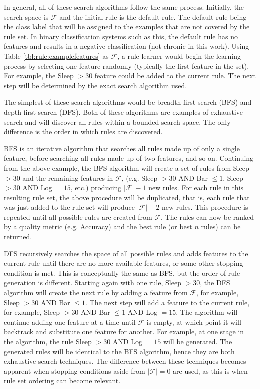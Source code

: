 In general, all of these search algorithms follow the same process. Initially, the search space is $\mathcal{F}$ and the initial rule is the default rule. The default rule being the class label that will be assigned to the examples that are not covered by the rule set. In binary classification systems such as this, the default rule has no features and results in a negative classification (not chronic in this work). Using Table \ref{tbl:rule:examplefeatures} as $\mathcal{F}$, a rule learner would begin the learning process by selecting one feature randomly (typically the first feature in the set). For example, the Sleep $> 30$ feature could be added to the current rule. The next step will be determined by the exact search algorithm used.

The simplest of these search algorithms would be breadth-first search (BFS) and depth-first search (DFS). Both of these algorithms are examples of exhaustive search and will discover all rules within a bounded search space. The only difference is the order in which rules are discovered.

BFS is an iterative algorithm that searches all rules made up of only a single feature, before searching all rules made up of two features, and so on. Continuing from the above example, the BFS algorithm will create a set of rules from Sleep $> 30$ and the remaining features in $\mathcal{F}$, (e.g. Sleep $> 30$ AND Bar $\leq 1$, Sleep $> 30$ AND Log $= 15$, etc.) producing $|\mathcal{F}| - 1$ new rules. For each rule in this resulting rule set, the above procedure will be duplicated, that is, each rule that was just added to the rule set will produce $|\mathcal{F}| -2$ new rules. This procedure is repeated until all possible rules are created from $\mathcal{F}$. The rules can now be ranked by a quality metric (e.g. Accuracy) and the best rule (or best $n$ rules) can be returned.

DFS recursively searches the space of all possible rules and adds features to the current rule until there are no more available features, or some other stopping condition is met. This is conceptually the same as BFS, but the order of rule generation is different. Starting again with one rule, Sleep $> 30$, the DFS algorithm will create the next rule by adding a feature from $\mathcal{F}$, for example, Sleep $> 30$ AND Bar $\leq 1$. The next step will add a feature to the current rule, for example, Sleep $> 30$ AND Bar $\leq 1$ AND Log $=15$. The algorithm will continue adding one feature at a time until $\mathcal{F}$ is empty, at which point it will backtrack and substitute one feature for another. For example, at one stage in the algorithm, the rule Sleep $> 30$ AND Log $= 15$ will be generated. The generated rules will be identical to the BFS algorithm, hence they are both exhaustive search techniques. The difference between these techniques becomes apparent when stopping conditions aside from $|\mathcal{F}| = 0$ are used, as this is when rule set ordering can become relevant.

